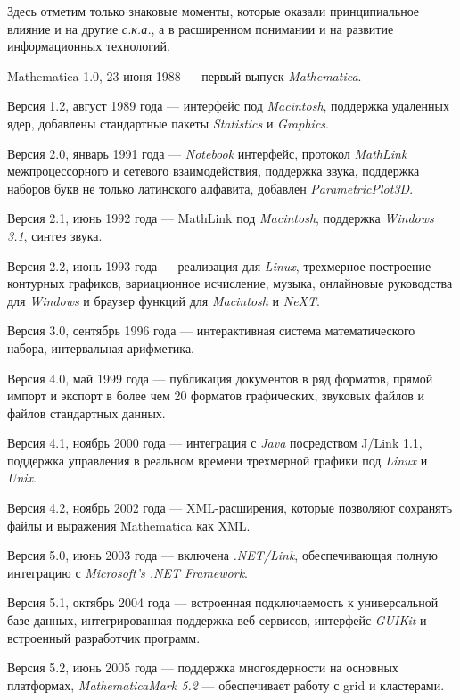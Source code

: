 Здесь отметим только знаковые моменты, которые оказали принципиальное влияние и на другие \textit{с.к.а.}, а в расширенном понимании и на развитие информационных технологий.
\begin{textitemize}
	\item Mathematica 1.0, 23 июня 1988 --- первый выпуск \textit{Mathematica}.
	\item Версия 1.2, август 1989 года --- интерфейс под \textit{Macintosh}, поддержка удаленных ядер, добавлены стандартные пакеты \textit{Statistics} и \textit{Graphics}.
	\item Версия 2.0, январь 1991 года --- \textit{Notebook} интерфейс, протокол \textit{MathLink} межпроцессорного и сетевого взаимодействия, поддержка звука, поддержка наборов букв не только латинского алфавита, добавлен \textit{ParametricPlot3D}.
	\item Версия 2.1, июнь 1992 года --- MathLink под \textit{Macintosh}, поддержка \textit{Windows 3.1}, синтез звука.
	\item Версия 2.2, июнь 1993 года --- реализация для \textit{Linux}, трехмерное построение контурных графиков, вариационное исчисление, музыка, онлайновые руководства для \textit{Windows} и браузер функций для \textit{Macintosh} и \textit{NeXT}.
	\item Версия 3.0, сентябрь 1996 года --- интерактивная система математического набора, интервальная арифметика.
	\item Версия 4.0, май 1999 года --- публикация документов в ряд форматов, прямой импорт и экспорт в более чем 20 форматов графических, звуковых файлов и файлов стандартных данных.
	\item Версия 4.1, ноябрь 2000 года --- интеграция с \textit{Java} посредством J/Link 1.1, поддержка управления в реальном времени трехмерной графики под \textit{Linux} и \textit{Unix}.
	\item Версия 4.2, ноябрь 2002 года --- XML-расширения, которые позволяют сохранять файлы и выражения Mathematica как XML.
	\item Версия 5.0, июнь 2003 года --- включена \textit{.NET/Link}, обеспечивающая полную интеграцию с \textit{Microsoft’s .NET Framework}.
	\item Версия 5.1, октябрь 2004 года --- встроенная подключаемость к универсальной базе данных, интегрированная поддержка веб-сервисов, интерфейс \textit{GUIKit} и встроенный разработчик программ.
	\item Версия 5.2, июнь 2005 года --- поддержка многоядерности на основных платформах, \textit{MathematicaMark 5.2} --- обеспечивает работу с grid и кластерами.

\end{textitemize}
